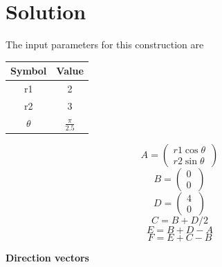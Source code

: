 \documentclass[10pt, a4paper]{article}
\begin{document}
\section{Solution}
\begin{center}
The input parameters for this construction are
\begin{tabular}{|c|c|}
	\hline
	\textbf{Symbol}&\textbf{Value}\\
	\hline
	r1&2\\
	\hline
	r2&3\\
	\hline
	$\theta$&$\frac{\pi}{2.5}$\\
	\hline
\end{tabular}
\boldmath
$${A}=\begin{pmatrix} r1\cos\theta\\ r2\sin\theta\ \end{pmatrix}$$
$${B}=\begin{pmatrix} 0\\ 0\ \end{pmatrix}$$
$${D}=\begin{pmatrix} 4\\ 0\ \end{pmatrix}$$
$${C}={{B}+{D}}/2$$
$${E}={{B}+{D}-{A}}$$
$${F}={{E}+{C}-{B}}$$
\unboldmath
\end{center}
\textbf{Direction vectors}
\end{document}
